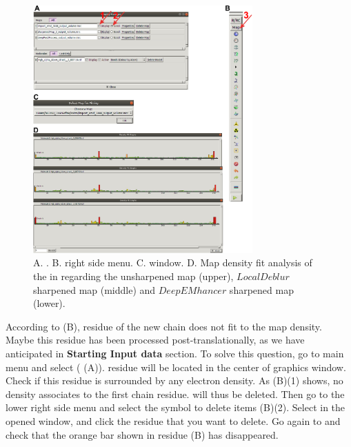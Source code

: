  \begin{figure}[H]
  \centering 
  \captionsetup{width=.9\linewidth} 
  \includegraphics[width=0.75\textwidth]{Images/Fig25}
  \caption{A. \coot {}. B. \coot right side menu. C. \coot {} window. D. Map density fit analysis of the  in \coot regarding the unsharpened map (upper), $LocalDeblur$ sharpened map (middle) and $DeepEMhancer$ sharpened map (lower).}
  \label{fig:coot_density_fit_analysis}
  \end{figure}
  
  According to  (B),  residue of the new chain  does not fit to the map density. Maybe this residue has been processed post-translationally, as we have anticipated in \textbf{Starting Input data} section. To solve this question, go to \coot main menu and select  ( (A)).  residue will be located in the center of \coot graphics window. Check if this residue is surrounded by any electron density. As  (B)(1) shows, no density associates to the first chain residue.  will thus be deleted. Then go to the lower right side menu and select the symbol to delete items (B)(2). Select  in the opened  window, and click the  residue that you want to delete. Go again to  and check that the orange bar shown in  residue  (B) has disappeared.
  
